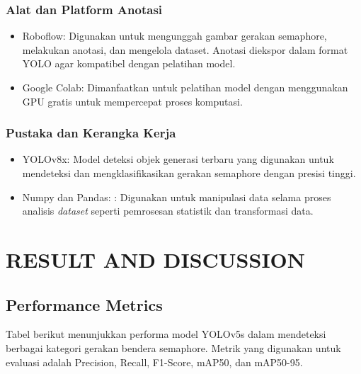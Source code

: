 \documentclass[12pt,a4paper]{article}
\begin{document}
\subsubsection{Alat dan Platform Anotasi}
\begin{itemize}
    \item Roboflow: Digunakan untuk mengunggah gambar gerakan semaphore, melakukan anotasi, dan mengelola dataset. Anotasi diekspor dalam format YOLO agar kompatibel dengan pelatihan model.
    \item Google Colab: Dimanfaatkan untuk pelatihan model dengan menggunakan GPU gratis untuk mempercepat proses komputasi.
\end{itemize}

\subsubsection{Pustaka dan Kerangka Kerja}
\begin{itemize}
    \item YOLOv8x: Model deteksi objek generasi terbaru yang digunakan untuk mendeteksi dan mengklasifikasikan gerakan semaphore dengan presisi tinggi.
    \item Numpy dan Pandas: : Digunakan untuk manipulasi data selama proses analisis \textit{dataset} seperti pemrosesan statistik dan transformasi data.
\end{itemize}

\section{RESULT AND DISCUSSION}
\subsection{Performance Metrics}
Tabel berikut menunjukkan performa model YOLOv5s dalam mendeteksi berbagai kategori gerakan bendera semaphore. Metrik yang digunakan untuk evaluasi adalah Precision, Recall, F1-Score, mAP50, dan mAP50-95.
\end{document}
